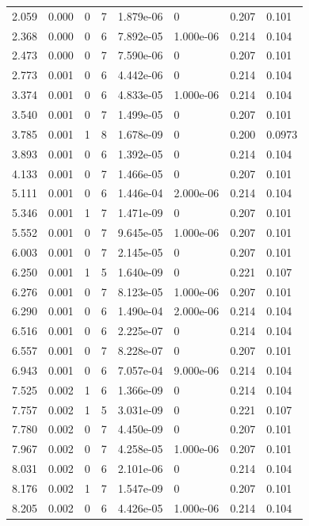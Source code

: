 \documentclass[preview]{standalone}
\begin{document}
{{\begin{tabular}{L{1.2cm}C{1.2cm} C{0.3cm}C{0.5cm} C{1.4cm}C{1.4cm} C{1.4cm}C{1.4cm}}
  2.059  &  0.000  & 0     &  7 &  1.879e-06  & 0  & 0.207 &  0.101   \\ 
  2.368  &  0.000  & 0     &  6 &  7.892e-05  & 1.000e-06  & 0.214 &  0.104   \\ 
  2.473  &  0.000  & 0     &  7 &  7.590e-06  & 0  & 0.207 &  0.101   \\ 
  2.773  &  0.001  & 0     &  6 &  4.442e-06  & 0  & 0.214 &  0.104   \\ 
  3.374  &  0.001  & 0     &  6 &  4.833e-05  & 1.000e-06  & 0.214 &  0.104   \\ 
  3.540  &  0.001  & 0     &  7 &  1.499e-05  & 0  & 0.207 &  0.101   \\ 
  3.785  &  0.001  & 1     &  8 &  1.678e-09  & 0  & 0.200 &  0.0973   \\ 
  3.893  &  0.001  & 0     &  6 &  1.392e-05  & 0  & 0.214 &  0.104   \\ 
  4.133  &  0.001  & 0     &  7 &  1.466e-05  & 0  & 0.207 &  0.101   \\ 
  5.111  &  0.001  & 0     &  6 &  1.446e-04  & 2.000e-06  & 0.214 &  0.104   \\ 
  5.346  &  0.001  & 1     &  7 &  1.471e-09  & 0  & 0.207 &  0.101   \\ 
  5.552  &  0.001  & 0     &  7 &  9.645e-05  & 1.000e-06  & 0.207 &  0.101   \\ 
  6.003  &  0.001  & 0     &  7 &  2.145e-05  & 0  & 0.207 &  0.101   \\ 
  6.250  &  0.001  & 1     &  5 &  1.640e-09  & 0  & 0.221 &  0.107   \\ 
  6.276  &  0.001  & 0     &  7 &  8.123e-05  & 1.000e-06  & 0.207 &  0.101   \\ 
  6.290  &  0.001  & 0     &  6 &  1.490e-04  & 2.000e-06  & 0.214 &  0.104   \\ 
  6.516  &  0.001  & 0     &  6 &  2.225e-07  & 0  & 0.214 &  0.104   \\ 
  6.557  &  0.001  & 0     &  7 &  8.228e-07  & 0  & 0.207 &  0.101   \\ 
  6.943  &  0.001  & 0     &  6 &  7.057e-04  & 9.000e-06  & 0.214 &  0.104   \\ 
  7.525  &  0.002  & 1     &  6 &  1.366e-09  & 0  & 0.214 &  0.104   \\ 
  7.757  &  0.002  & 1     &  5 &  3.031e-09  & 0  & 0.221 &  0.107   \\ 
  7.780  &  0.002  & 0     &  7 &  4.450e-09  & 0  & 0.207 &  0.101   \\ 
  7.967  &  0.002  & 0     &  7 &  4.258e-05  & 1.000e-06  & 0.207 &  0.101   \\ 
  8.031  &  0.002  & 0     &  6 &  2.101e-06  & 0  & 0.214 &  0.104   \\ 
  8.176  &  0.002  & 1     &  7 &  1.547e-09  & 0  & 0.207 &  0.101   \\ 
  8.205  &  0.002  & 0     &  6 &  4.426e-05  & 1.000e-06  & 0.214 &  0.104   \\ 
\hline 
\end{tabular} 

}}
\end{document}
